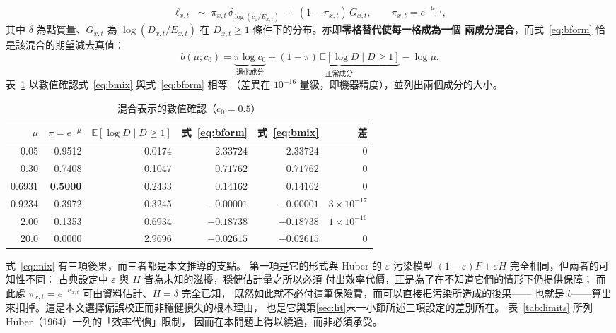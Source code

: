 \documentclass[UTF8, fontset=macnew, a4paper, 12pt]{ctexart}
\newcommand{\Ex}{\mathbb{E}}
\begin{document}
\begin{equation}\label{eq:mix}
\ell_{x,t}\;\sim\;\pi_{x,t}\,\delta_{\log(c_0/E_{x,t})}
\;+\;(1-\pi_{x,t})\,G_{x,t},
\qquad \pi_{x,t}=e^{-\mu_{x,t}},
\end{equation}
其中 $\delta$ 為點質量、$G_{x,t}$ 為 $\log(D_{x,t}/E_{x,t})$ 在
$D_{x,t}\ge1$ 條件下的分布。亦即\textbf{零格替代使每一格成為一個
兩成分混合}，而式~\eqref{eq:bform} 恰是該混合的期望減去真值：
\begin{equation}\label{eq:bmix}
b(\mu;c_0)=\underbrace{\pi\log c_0}_{\text{退化成分}}
+\underbrace{(1-\pi)\,\Ex[\log D\mid D\ge1]}_{\text{正常成分}}-\log\mu .
\end{equation}
表~\ref{tab:mix} 以數值確認式~\eqref{eq:bmix} 與式~\eqref{eq:bform} 相等
（差異在 $10^{-16}$ 量級，即機器精度），並列出兩個成分的大小。

\begin{table}[H]
\centering
\caption{混合表示的數值確認（$c_0=0.5$）}
\small
\begin{tabular}{rrrrrr}
\toprule
$\mu$ & $\pi=e^{-\mu}$ & $\Ex[\log D\mid D\ge1]$ & 式~\eqref{eq:bform} & 式~\eqref{eq:bmix} & 差\\
\midrule
0.05   & 0.9512 & 0.0174 & $2.33724$  & $2.33724$  & $0$\\
0.30   & 0.7408 & 0.1047 & $0.71762$  & $0.71762$  & $0$\\
0.6931 & \textbf{0.5000} & 0.2433 & $0.14162$  & $0.14162$  & $0$\\
0.9234 & 0.3972 & 0.3245 & $-0.00001$ & $-0.00001$ & $3\times10^{-17}$\\
2.00   & 0.1353 & 0.6934 & $-0.18738$ & $-0.18738$ & $1\times10^{-16}$\\
20.0   & 0.0000 & 2.9696 & $-0.02615$ & $-0.02615$ & $0$\\
\bottomrule
\end{tabular}
\label{tab:mix}
\end{table}

式~\eqref{eq:mix} 有三項後果，而三者都是本文推導的支點。
第一項是它的形式與 Huber 的 $\varepsilon$-污染模型
$(1-\varepsilon)F+\varepsilon H$ 完全相同，但兩者的可知性不同：
古典設定中 $\varepsilon$ 與 $H$ 皆為未知的滋擾，穩健估計量之所以必須
付出效率代價，正是為了在不知道它們的情形下仍提供保障；
而此處 $\pi_{x,t}=e^{-\mu_{x,t}}$ 可由資料估計、$H=\delta$ 完全已知，
既然如此就不必付這筆保險費，而可以直接把污染所造成的後果——
也就是 $b$——算出來扣掉。這是本文選擇偏誤校正而非穩健損失的根本理由，
也是它與第\ref{sec:lit}末一小節所述三項設定的差別所在。
表~\ref{tab:limits} 所列 Huber（1964）一列的「效率代價」限制，
因而在本問題上得以繞過，而非必須承受。
\end{document}

